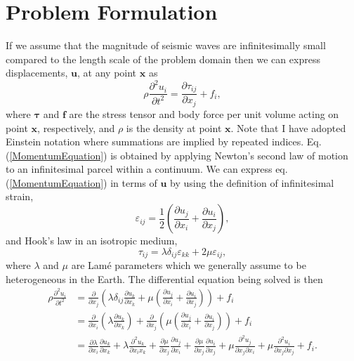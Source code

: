 \documentclass[12pt]{article}
\begin{document}
\section*{Problem Formulation}
If we assume that the magnitude of seismic waves are infinitesimally
small compared to the length scale of the problem domain then we can
express displacements, $\boldsymbol{u}$, at any point $\boldsymbol{x}$ as 
\begin{equation}\label{MomentumEquation}
  \rho\frac{\partial^2 u_i}{\partial t^2}  = \frac{\partial \tau_{ij}}{\partial x_j} + f_i,
\end{equation}
where $\boldsymbol{\tau}$ and $\boldsymbol{f}$ are the stress tensor
and body force per unit volume acting on point $\boldsymbol{x}$, respectively, and
$\rho$ is the density at point $\boldsymbol{x}$. Note that I have
adopted Einstein notation where summations are implied by repeated
indices.  Eq. (\ref{MomentumEquation}) is obtained by applying
Newton's second law of motion to an infinitesimal parcel within a
continuum.  We can express eq. (\ref{MomentumEquation}) in terms of
$\boldsymbol{u}$ by using the definition of infinitesimal strain,
\begin{equation}\label{Strain}
  \varepsilon_{ij} = \frac{1}{2}\left(\frac{\partial u_j}{\partial x_i} + 
                                \frac{\partial u_i}{\partial x_j}\right),
\end{equation}
and Hook's law in an isotropic medium,
\begin{equation}\label{HooksLaw}
  \tau_{ij} = \lambda\delta_{ij}\varepsilon_{kk} + 2\mu\varepsilon_{ij},
\end{equation}
where $\lambda$ and $\mu$ are Lam\'e parameters which we generally
assume to be heterogeneous in the Earth.  The differential equation
being solved is then
\begin{align}\label{DiffEq}
  \rho\frac{\partial^2 u_i}{\partial t^2} &= 
    \frac{\partial}{\partial x_j}\left(\lambda\delta_{ij}\frac{\partial u_k}{\partial x_k} +
    \mu\left(\frac{\partial u_j}{\partial x_i} + \frac{\partial
    u_i}{\partial x_j}\right)\right) + f_i\\\nonumber
  &= 
    \frac{\partial}{\partial x_i}\left(\lambda\frac{\partial u_k}{\partial x_k}\right) +
    \frac{\partial}{\partial x_j}\left(\mu\left(\frac{\partial u_j}{\partial x_i} + \frac{\partial
    u_i}{\partial x_j}\right)\right) + f_i\\\nonumber
  &= 
    \frac{\partial \lambda}{\partial x_i}
    \frac{\partial u_k}{\partial x_k} +
    \lambda\frac{\partial^2 u_k}{\partial x_i x_k} +
    \frac{\partial \mu}{\partial x_j}\frac{\partial u_j}{\partial x_i} +
    \frac{\partial \mu}{\partial x_j}\frac{\partial u_i}{\partial x_j} +
    \mu\frac{\partial^2 u_j}{\partial x_j \partial x_i} + 
    \mu\frac{\partial^2 u_i}{\partial x_j \partial x_j} + f_i.
\end{align}
\end{document}
